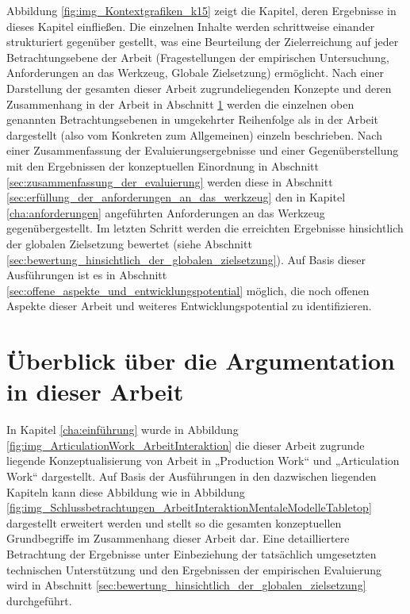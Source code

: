 Abbildung \ref{fig:img_Kontextgrafiken_k15} zeigt die Kapitel, deren Ergebnisse in dieses Kapitel einfließen. Die einzelnen Inhalte werden schrittweise einander strukturiert gegenüber gestellt, was eine Beurteilung der Zielerreichung auf jeder Betrachtungsebene der Arbeit (Fragestellungen der empirischen Untersuchung, Anforderungen an das Werkzeug, Globale Zielsetzung) ermöglicht. Nach einer Darstellung der gesamten dieser Arbeit zugrundeliegenden Konzepte und deren Zusammenhang in der Arbeit in Abschnitt \ref{sec:überblick_über_den_gesamtzusammenhang} werden die einzelnen oben genannten Betrachtungsebenen in umgekehrter Reihenfolge als in der Arbeit dargestellt (also vom Konkreten zum Allgemeinen) einzeln beschrieben. Nach einer Zusammenfassung der Evaluierungsergebnisse und einer Gegenüberstellung mit den Ergebnissen der konzeptuellen Einordnung in Abschnitt \ref{sec:zusammenfassung_der_evaluierung} werden diese in Abschnitt \ref{sec:erfüllung_der_anforderungen_an_das_werkzeug} den in Kapitel \ref{cha:anforderungen} angeführten Anforderungen an das Werkzeug gegenübergestellt. Im letzten Schritt werden die erreichten Ergebnisse hinsichtlich der globalen Zielsetzung bewertet (siehe Abschnitt \ref{sec:bewertung_hinsichtlich_der_globalen_zielsetzung}). Auf Basis dieser Ausführungen ist es in Abschnitt \ref{sec:offene_aspekte_und_entwicklungspotential} möglich, die noch offenen Aspekte dieser Arbeit und weiteres Entwicklungspotential zu identifizieren.

\section{Überblick über die Argumentation in dieser Arbeit} %
\label{sec:überblick_über_den_gesamtzusammenhang}

In Kapitel \ref{cha:einführung} wurde in Abbildung \ref{fig:img_ArticulationWork_ArbeitInteraktion} die dieser Arbeit zugrunde liegende Konzeptualisierung von Arbeit in „Production Work“ und „Articulation Work“ dargestellt. Auf Basis der Ausführungen in den dazwischen liegenden Kapiteln kann diese Abbildung wie in Abbildung \ref{fig:img_Schlussbetrachtungen_ArbeitInteraktionMentaleModelleTabletop} dargestellt erweitert werden und stellt so die gesamten konzeptuellen Grundbegriffe im Zusammenhang dieser Arbeit dar. Eine detailliertere Betrachtung der Ergebnisse unter Einbeziehung der tatsächlich umgesetzten technischen Unterstützung und den Ergebnissen der empirischen Evaluierung wird in Abschnitt \ref{sec:bewertung_hinsichtlich_der_globalen_zielsetzung} durchgeführt.

